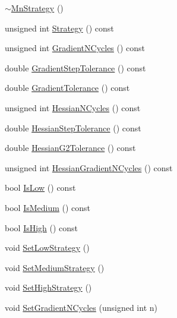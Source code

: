 \begin{DoxyCompactItemize}
\mbox{\hyperlink{classROOT_1_1Minuit2_1_1MnStrategy_a65ddda119cec991c9d07671c1a8af521}{$\sim$\+Mn\+Strategy}} ()
\item 
unsigned int \mbox{\hyperlink{classROOT_1_1Minuit2_1_1MnStrategy_a1ff03f5ccec83aa19770d080b2be2334}{Strategy}} () const
\item 
unsigned int \mbox{\hyperlink{classROOT_1_1Minuit2_1_1MnStrategy_ab2f1980e3eb9f9b0818cf6f8c24b6311}{Gradient\+N\+Cycles}} () const
\item 
double \mbox{\hyperlink{classROOT_1_1Minuit2_1_1MnStrategy_a5352522cca1056c242a309d29e28e3c2}{Gradient\+Step\+Tolerance}} () const
\item 
double \mbox{\hyperlink{classROOT_1_1Minuit2_1_1MnStrategy_a94681b616c41570e2c81ef5c94cb81dd}{Gradient\+Tolerance}} () const
\item 
unsigned int \mbox{\hyperlink{classROOT_1_1Minuit2_1_1MnStrategy_ab2342c7f4896a8ed08c9df93fca93066}{Hessian\+N\+Cycles}} () const
\item 
double \mbox{\hyperlink{classROOT_1_1Minuit2_1_1MnStrategy_aaee4b3cbe14d4caa2d57fbc93b451ac2}{Hessian\+Step\+Tolerance}} () const
\item 
double \mbox{\hyperlink{classROOT_1_1Minuit2_1_1MnStrategy_a0b111848a04cb9b95615402c78709846}{Hessian\+G2\+Tolerance}} () const
\item 
unsigned int \mbox{\hyperlink{classROOT_1_1Minuit2_1_1MnStrategy_a49354e374820b73f7e8b6701d7e07922}{Hessian\+Gradient\+N\+Cycles}} () const
\item 
bool \mbox{\hyperlink{classROOT_1_1Minuit2_1_1MnStrategy_a5b777bca218ea524454f304e67fbbf83}{Is\+Low}} () const
\item 
bool \mbox{\hyperlink{classROOT_1_1Minuit2_1_1MnStrategy_a83e9fa3f54c51bbf7f54de2096d75cfe}{Is\+Medium}} () const
\item 
bool \mbox{\hyperlink{classROOT_1_1Minuit2_1_1MnStrategy_a49f91ddb7327a651bc0580e644acc8fb}{Is\+High}} () const
\item 
void \mbox{\hyperlink{classROOT_1_1Minuit2_1_1MnStrategy_a24671e2ae8a1224583adfcb3fb73ad55}{Set\+Low\+Strategy}} ()
\item 
void \mbox{\hyperlink{classROOT_1_1Minuit2_1_1MnStrategy_ae813d1aedcf6fa8f2bfb09a501a783f4}{Set\+Medium\+Strategy}} ()
\item 
void \mbox{\hyperlink{classROOT_1_1Minuit2_1_1MnStrategy_a92e5deb2087eec6e0d7db5d5789f3a06}{Set\+High\+Strategy}} ()
\item 
void \mbox{\hyperlink{classROOT_1_1Minuit2_1_1MnStrategy_abf74d8c002c658339f15df4b56aa4fdb}{Set\+Gradient\+N\+Cycles}} (unsigned int n)

\end{DoxyCompactItemize}
